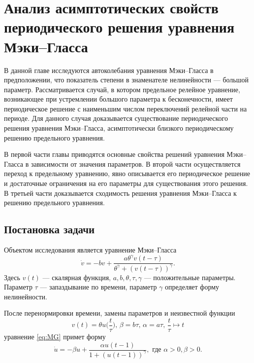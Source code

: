 \chapter{Анализ асимптотических свойств периодического решения уравнения Мэки--Гласса}\label{ch:ch1}

В данной главе исследуются автоколебания уравнения Мэки--Гласса в предположении, что показатель степени в знаменателе нелинейности --- большой параметр. Рассматривается случай, в котором предельное релейное уравнение, возникающее при устремлении большого параметра к бесконечности, имеет периодическое решение с наименьшим числом переключений релейной части на периоде. Для данного случая доказывается существование периодического решения уравнения Мэки--Гласса, асимптотически близкого периодическому решению предельного уравнения.

В первой части главы приводятся основные свойства решений уравнения Мэки--Гласса в зависимости от значения параметров. В второй части осуществляется переход к предельному уравнению, явно описывается его периодическое решение и достаточные ограничения на его параметры для существования этого решения. В третьей части доказывается сходимость решения уравнения Мэки--Гласса к решению предельного уравнения.

\section{Постановка задачи}

Объектом исследования является уравнение Мэки--Гласса 
\cite{Mackey1977, Glass1988}
\begin{equation}
	\label{eq:MG}
	\dot{v}=-b v+\frac{a \theta^{\gamma} v(t-\tau)}{\theta^{\gamma}+(v(t-\tau))^{\gamma}}.
\end{equation}
Здесь $v(t)$ --- скалярная функция, $a, b, \theta, \tau, \gamma$ --- положительные параметры. Параметр $\tau$ --- запаздывание по времени, параметр $\gamma$ определяет форму нелинейности.

После перенормировки времени, замены параметров и неизвестной функции 
\begin{equation}
	\label{eq:substitutions_v}
	v(t) = \theta u\Big(\frac{t}{\tau}\Big),\, \beta = b\tau,\, \alpha=a\tau, \, \frac{t}{\tau} \mapsto t
\end{equation}
уравнение \eqref{eq:MG} примет форму
\begin{equation}
	\label{eq:MG_norm}
	\dot{u}=-\beta u+\frac{\alpha u(t-1)}{1+(u(t-1))^\gamma}, \text{ где } \alpha > 0, \beta > 0.
\end{equation}

